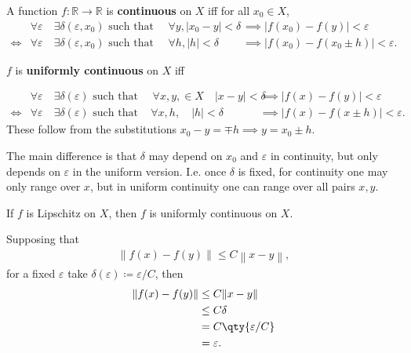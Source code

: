 \begin{definition}

A function \(f: {\mathbb{R}}\to {\mathbb{R}}\) is \textbf{continuous} on
\(X\) iff for all \(x_0\in X\),
\begin{align*}
&\forall \varepsilon \quad \exists \delta(\varepsilon, x_0) \text{ such that }\quad \forall y, {\left\lvert {x_0 - y} \right\rvert} < \delta &&\implies {\left\lvert {f(x_0) - f(y)} \right\rvert} < \varepsilon \\
\iff &\forall \varepsilon \quad \exists \delta(\varepsilon, x_0) \text{ such that }\quad \forall h, {\left\lvert {h} \right\rvert} < \delta &&\implies {\left\lvert {f(x_0) - f(x_0 \pm h)} \right\rvert} < \varepsilon
.\end{align*}

\(f\) is \textbf{uniformly continuous} on \(X\) iff

\begin{align*}
  &\forall \varepsilon \quad \exists \delta(\varepsilon) \text{ such that }\quad \forall x, y, \in X \quad {\left\lvert {x - y} \right\rvert} < \delta &&\implies {\left\lvert {f(x) - f(y)} \right\rvert} < \varepsilon \\
\iff &\forall \varepsilon \quad \exists \delta(\varepsilon) \text{ such that} \quad \, \forall x, h, \quad {\left\lvert {h} \right\rvert} < \delta &&\implies {\left\lvert {f(x) - f(x \pm h)} \right\rvert} < \varepsilon
.\end{align*}
These follow from the substitutions
\(x_0-y = \mp h \implies y = x_0 \pm h\).

\end{definition}

\begin{remark}

The main difference is that \(\delta\) may depend on \(x_0\) and
\({\varepsilon}\) in continuity, but only depends on \({\varepsilon}\)
in the uniform version. I.e. once \(\delta\) is fixed, for continuity
one may only range over \(x\), but in uniform continuity one can range
over all pairs \(x,y\).

\end{remark}

\begin{proposition}

If \(f\) is Lipschitz on \(X\), then \(f\) is uniformly continuous on
\(X\).

Supposing that
\begin{align*}
{\left\lVert {f(x) - f(y)} \right\rVert} \leq C {\left\lVert {x-y} \right\rVert}
,\end{align*}
for a fixed \({\varepsilon}\) take
\(\delta({\varepsilon}) \coloneqq{\varepsilon}/C\), then
\begin{align*}
{\left\lVert {f(x) - f(y)} \right\rVert}
&\leq C {\left\lVert {x-y} \right\rVert} \\
&\leq C \delta \\
&= C \qty{{\varepsilon}/C} \\
&= {\varepsilon}
.\end{align*}

\end{proposition}

